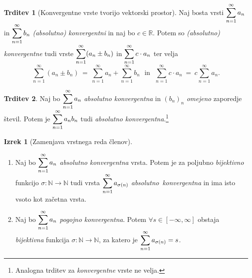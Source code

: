 \documentclass[11pt]{article}
\newcommand{\R}{\mathbb{R}}
\newcommand{\N}{\mathbb{N}}
\theoremstyle{definition}
\theoremstyle{definition}
\newtheorem{trditev}{Trditev}[section]
\theoremstyle{definition}
\newtheorem{izrek}{Izrek}[section]
\theoremstyle{theorem}
\begin{document}
\begin{trditev}[Konvergentne vrste tvorijo vektorski prostor]

Naj bosta vrsti $\mathlarger{\sum_{n=1}^\infty a_n}$ in $\mathlarger{\sum_{n=1}^\infty b_n}$ \textit{(absolutno) konvergentni} in naj bo $c \in \R$. Potem so \textit{(absolutno) konvergentne} tudi vrste $\mathlarger{\sum_{n=1}^\infty (a_n \pm b_n)}$ in $\mathlarger{\sum_{n=1}^\infty c \cdot a_n}$ ter velja
$$\sum_{n=1}^\infty (a_n \pm b_n) ~=~ \sum_{n=1}^\infty a_n + \sum_{n=1}^\infty b_n ~~~\text{in}~~~ \sum_{n=1}^\infty c \cdot a_n ~=~ c \sum_{n=1}^\infty a_n.$$

\end{trditev}
\vspace{0.5cm}

\begin{trditev}

Naj bo $\mathlarger{\sum_{n=1}^\infty a_n}$ \textit{absolutno konvergentna} in $(b_n)_n$ \textit{omejeno} \hbox{zaporedje} števil.  Potem je $\mathlarger{\sum_{n=1}^\infty a_n b_n}$ tudi \textit{absolutno konvergentna}.\footnote{Analogna trditev za \textit{konvergentne} vrste ne velja.}

\end{trditev}
\vspace{0.5cm}

\begin{izrek}[Zamenjava vrstnega reda členov]
~
\begin{enumerate}

\item[(1)] Naj bo $\mathlarger{\sum_{n=1}^\infty a_n}$ \textit{absolutno konvergentna} vrsta. Potem je za poljubno \hbox{\textit{bijektivno}} funkcijo $\sigma: \N \rightarrow \N$ tudi vrsta $\mathlarger{\sum_{n=1}^\infty a_{\sigma(n)}}$ \hbox{\textit{absolutno konvergentna}} in ima isto vsoto kot začetna vrsta.

\item[(2)] Naj bo $\mathlarger{\sum_{n=1}^\infty a_n}$ \textit{pogojno konvergentna}. Potem $\forall s \in [-\infty, \infty]$ obstaja \textit{bijektivna} funkcija $\sigma: \N \rightarrow \N$, za katero je $\mathlarger{\sum_{n=1}^\infty a_{\sigma(n)}} = s$.

\end{enumerate}

\end{izrek}
\vspace{0.5cm}

\end{document}

